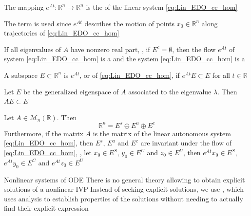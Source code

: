 \documentclass[aspectratio=169]{beamer}
\begin{document}
\begin{frame}
\begin{definition}
The mapping $e^{At}:\mathbb{R}^n\to\mathbb{R}^n$ is the  of the linear system \eqref{eq:Lin_EDO_cc_hom}
\end{definition}
The term  is used since $e^{At}$ describes the motion of points $x_0\in\mathbb{R}^n$ along trajectories of \eqref{eq:Lin_EDO_cc_hom}
\vfill
\begin{definition}
If all eigenvalues of $A$ have nonzero real part, \ie, if $E^c=\emptyset$, then the flow $e^{At}$ of system \eqref{eq:Lin_EDO_cc_hom} is a  and the system \eqref{eq:Lin_EDO_cc_hom} is a 
\end{definition}
\vfill
\begin{definition}
A subspace $E\subset\mathbb{R}^n$ is  $e^{At}$, or  of \eqref{eq:Lin_EDO_cc_hom}, if $e^{At}E\subset E$ for all $t\in\mathbb{R}$
\end{definition}
\end{frame}

\begin{frame}
\begin{theorem}
Let $E$ be the generalized eigenspace of $A$ associated to the eigenvalue $\lambda$. Then $AE\subset E$
\end{theorem}
\vfill
\begin{theorem}
Let $A\in\mathcal{M}_n(\mathbb{R})$. Then
\[
\mathbb{R}^n=E^s\oplus E^u\oplus E^c
\]
Furthermore, if the matrix $A$ is the matrix of the linear autonomous system \eqref{eq:Lin_EDO_cc_hom}, then $E^s$, $E^u$ and $E^c$ are invariant under the flow of \eqref{eq:Lin_EDO_cc_hom}, \ie, let
$x_0\in E^S$, $y_0\in E^C$ and $z_0\in E^U$, then $e^{At}x_0\in E^S$,
$e^{At}y_0\in E^C$ and $e^{At}z_0\in E^U$
\end{theorem}
\end{frame}



\begin{frame}{Nonlinear systems of ODE}
There is no general theory allowing to obtain explicit solutions of a nonlinear IVP
\vfill
Instead of seeking explicit solutions, we use , which uses analysis to establish properties of the solutions without needing to actually find their explicit expression
\end{frame}
\end{document}
